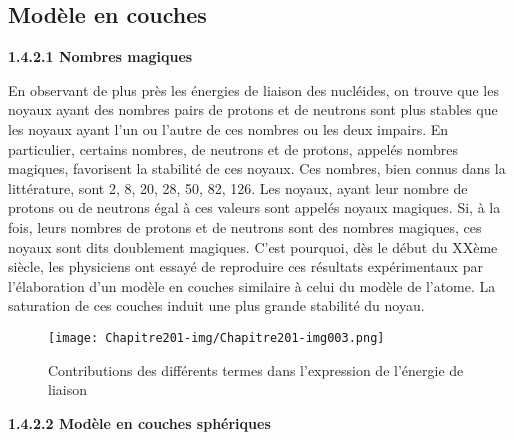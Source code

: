 \subsection{ Modèle en couches}

\textbf{1.4.2.1 Nombres magiques}

En observant de plus près les énergies de liaison des nucléides, on trouve que les noyaux ayant des nombres pairs de
protons et de neutrons sont plus stables que les noyaux ayant l'un ou l'autre de ces nombres ou les deux impairs. En
particulier, certains nombres, de neutrons et de protons, appelés {\textquotedbl}nombres magiques{\textquotedbl},
favorisent la stabilité de ces noyaux. Ces nombres, bien connus dans la littérature, sont 2, 8, 20, 28, 50, 82, 126.
Les noyaux, ayant leur nombre de protons ou de neutrons égal à ces valeurs sont appelés {\textquotedbl}noyaux
magiques{\textquotedbl}. Si, à la fois, leurs nombres de protons et de neutrons sont des nombres magiques, ces noyaux
sont dits {\textquotedbl}doublement magiques{\textquotedbl}. C'est pourquoi, dès le début du XXème siècle, les
physiciens ont essayé de reproduire ces résultats expérimentaux par l'élaboration d'un modèle en couches similaire à
celui du modèle de l'atome. La saturation de ces couches induit une plus grande stabilité du noyau.


 \begin{figure}[htb]
 	\texttt{[image: Chapitre201-img/Chapitre201-img003.png]}
 	\caption{Contributions des différents termes dans l'expression de l'énergie de liaison
}
 \end{figure}

\textbf{1.4.2.2 Modèle en couches sphériques}


